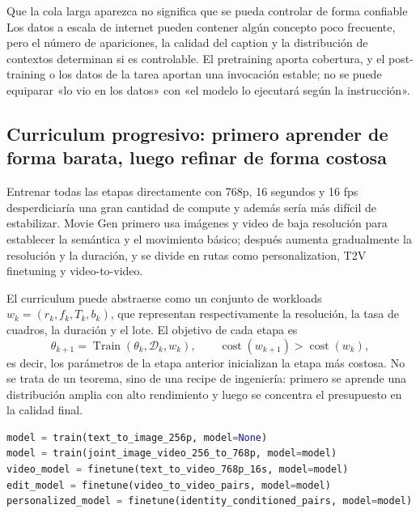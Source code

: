 \begin{warningbox}{Que la cola larga aparezca no significa que se pueda controlar de forma confiable}
Los datos a escala de internet pueden contener algún concepto poco frecuente, pero el número de apariciones, la calidad del caption y la distribución de contextos determinan si es controlable. El pretraining aporta cobertura, y el post-training o los datos de la tarea aportan una invocación estable; no se puede equiparar «lo vio en los datos» con «el modelo lo ejecutará según la instrucción».
\end{warningbox}


\subsection{Curriculum progresivo: primero aprender de forma barata, luego refinar de forma costosa}

Entrenar todas las etapas directamente con 768p, 16 segundos y 16 fps desperdiciaría una gran cantidad de compute y además sería más difícil de estabilizar. Movie Gen primero usa imágenes y video de baja resolución para establecer la semántica y el movimiento básico; después aumenta gradualmente la resolución y la duración, y se divide en rutas como personalization, T2V finetuning y video-to-video.


El curriculum puede abstraerse como un conjunto de workloads $w_k=(r_k,f_k,T_k,b_k)$, que representan respectivamente la resolución, la tasa de cuadros, la duración y el lote. El objetivo de cada etapa es
\[
\theta_{k+1}=\operatorname{Train}(\theta_k,\mathcal D_k,w_k),
\qquad
\operatorname{cost}(w_{k+1})>\operatorname{cost}(w_k),
\]
es decir, los parámetros de la etapa anterior inicializan la etapa más costosa. No se trata de un teorema, sino de una recipe de ingeniería: primero se aprende una distribución amplia con alto rendimiento y luego se concentra el presupuesto en la calidad final.

\begin{lstlisting}[language=Python,caption={Flujo conceptual del entrenamiento progresivo de imagen/video}]
model = train(text_to_image_256p, model=None)
model = train(joint_image_video_256_to_768p, model=model)
video_model = finetune(text_to_video_768p_16s, model=model)
edit_model = finetune(video_to_video_pairs, model=model)
personalized_model = finetune(identity_conditioned_pairs, model=model)
\end{lstlisting}

